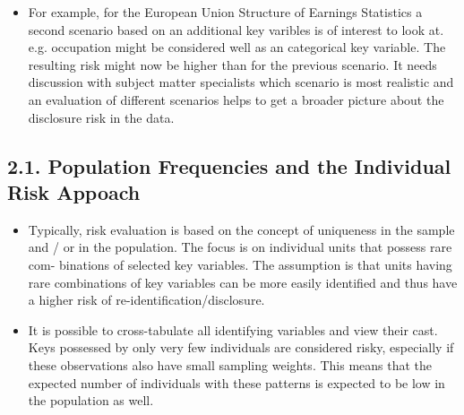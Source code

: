 \documentclass[]{article}
\begin{document}
\begin{itemize}
	\item For example, for the European Union Structure of Earnings
	Statistics a second scenario based on an additional key varibles is of interest to
	look at. e.g. occupation might be considered  well as an categorical key variable.
	The resulting risk might now be higher than for the previous scenario. It needs
	discussion with subject matter specialists which scenario is most realistic and an
	evaluation of different scenarios helps to get a broader picture about the disclosure
	risk in the data.
\end{itemize}

\newpage
\subsection*{2.1. Population Frequencies and the Individual Risk Appoach}

\begin{itemize}
\item Typically, risk evaluation is based on the concept of uniqueness in the sample
and / or in the population. The focus is on individual units that possess rare com-
binations of selected key variables. The assumption is that units having rare
combinations of key variables can be more easily identiﬁed and thus have a higher
risk of re-identiﬁcation/disclosure. 
\item It is possible to cross-tabulate all identifying
variables and view their cast. Keys possessed by only very few individuals are
considered risky, especially if these observations also have small sampling weights.
This means that the expected number of individuals with these patterns is expected to be low in the population as well.
\end{itemize}
\end{document}
